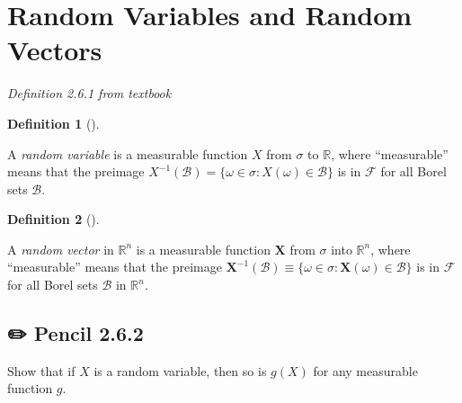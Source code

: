\documentclass[
  letterpaper,
  DIV=11,
  numbers=noendperiod]{scrreprt}
\theoremstyle{definition}
\newtheorem{definition}{Definition}[chapter]
\theoremstyle{plain}
\theoremstyle{remark}
\begin{document}
\hypertarget{random-variables-and-random-vectors}{%
\section*{Random Variables and Random
Vectors}\label{random-variables-and-random-vectors}}


\emph{Definition 2.6.1 from textbook}

\leavevmode{}%
\begin{definition}[]\label{def-random-variable}

A \emph{random variable} is a measurable function \(X\) from \(\sigma\)
to \(\mathbb{R}\), where ``measurable'' means that the preimage
\(X^{-1}(\mathcal{B}) = \{\omega \in \sigma : X(\omega) \in \mathcal{B}\}\)
is in \(\mathcal{F}\) for all Borel sets \(\mathcal{B}\).

\end{definition}

\leavevmode{}%
\begin{definition}[]\label{def-random-vector}

A \emph{random vector} in \(\mathbb{R}^n\) is a measurable function
\(\mathbf{X}\) from \(\sigma\) into \(\mathbb{R}^n\), where
``measurable'' means that the preimage
\(\mathbf{X}^{-1} (\mathcal{B}) \equiv \{\omega \in \sigma: \mathbf{X}(\omega) \in \mathcal{B}\}\)
is in \(\mathcal{F}\) for all Borel sets \(\mathcal{B}\) in
\(\mathbb{R}^n\).

\end{definition}

\hypertarget{pencil-2.6.2}{%
\subsection*{✏️ Pencil 2.6.2}\label{pencil-2.6.2}}

Show that if \(X\) is a random variable, then so is \(g(X)\) for any
measurable function \(g\).
\end{document}
